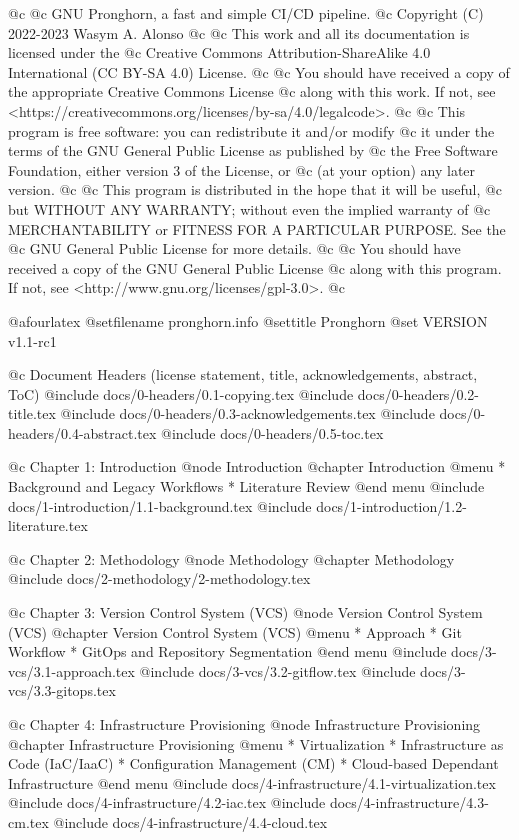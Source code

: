 


@c
@c GNU Pronghorn, a fast and simple CI/CD pipeline.
@c Copyright (C) 2022-2023 Wasym A. Alonso
@c
@c This work and all its documentation is licensed under the
@c Creative Commons Attribution-ShareAlike 4.0 International (CC BY-SA 4.0) License.
@c
@c You should have received a copy of the appropriate Creative Commons License
@c along with this work. If not, see <https://creativecommons.org/licenses/by-sa/4.0/legalcode>.
@c
@c This program is free software: you can redistribute it and/or modify
@c it under the terms of the GNU General Public License as published by
@c the Free Software Foundation, either version 3 of the License, or
@c (at your option) any later version.
@c
@c This program is distributed in the hope that it will be useful,
@c but WITHOUT ANY WARRANTY; without even the implied warranty of
@c MERCHANTABILITY or FITNESS FOR A PARTICULAR PURPOSE. See the
@c GNU General Public License for more details.
@c
@c You should have received a copy of the GNU General Public License
@c along with this program. If not, see <http://www.gnu.org/licenses/gpl-3.0>.
@c


@afourlatex
@setfilename pronghorn.info
@settitle Pronghorn
@set VERSION v1.1-rc1


@c Document Headers (license statement, title, acknowledgements, abstract, ToC)
@include docs/0-headers/0.1-copying.tex
@include docs/0-headers/0.2-title.tex
@include docs/0-headers/0.3-acknowledgements.tex
@include docs/0-headers/0.4-abstract.tex
@include docs/0-headers/0.5-toc.tex


@c Chapter 1: Introduction
@node Introduction
@chapter Introduction
@menu
* Background and Legacy Workflows
* Literature Review
@end menu
@include docs/1-introduction/1.1-background.tex
@include docs/1-introduction/1.2-literature.tex

@c Chapter 2: Methodology
@node Methodology
@chapter Methodology
@include docs/2-methodology/2-methodology.tex

@c Chapter 3: Version Control System (VCS)
@node Version Control System (VCS)
@chapter Version Control System (VCS)
@menu
* Approach
* Git Workflow
* GitOps and Repository Segmentation
@end menu
@include docs/3-vcs/3.1-approach.tex
@include docs/3-vcs/3.2-gitflow.tex
@include docs/3-vcs/3.3-gitops.tex

@c Chapter 4: Infrastructure Provisioning
@node Infrastructure Provisioning
@chapter Infrastructure Provisioning
@menu
* Virtualization
* Infrastructure as Code (IaC/IaaC)
* Configuration Management (CM)
* Cloud-based Dependant Infrastructure
@end menu
@include docs/4-infrastructure/4.1-virtualization.tex
@include docs/4-infrastructure/4.2-iac.tex
@include docs/4-infrastructure/4.3-cm.tex
@include docs/4-infrastructure/4.4-cloud.tex

